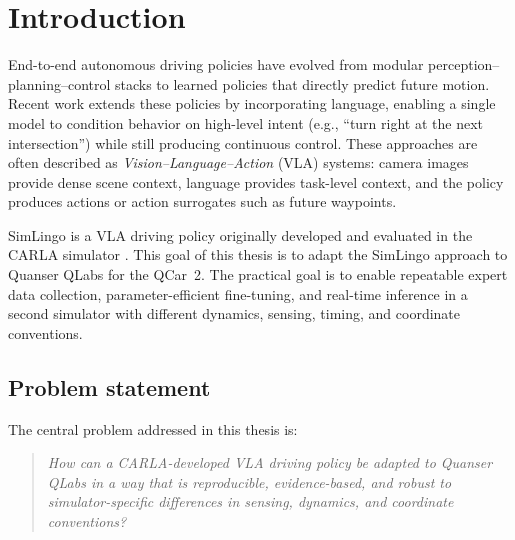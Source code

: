 \chapter{Introduction}
\label{ch:introduction}

End-to-end autonomous driving policies have evolved from modular perception--planning--control stacks to learned policies \citep{pomerleau1988alvinn,bojarski2016end} that directly predict future motion. Recent work extends these policies by incorporating language, enabling a single model to condition behavior on high-level intent (e.g., ``turn right at the next intersection'') while still producing continuous control. These approaches are often described as \emph{Vision--Language--Action} (VLA) systems: camera images provide dense scene context, language provides task-level context, and the policy produces actions or action surrogates such as future waypoints.

SimLingo is a VLA driving policy originally developed and evaluated in the CARLA simulator \citep{simlingo2023,dosovitskiy2017carla}. This goal of this thesis is to adapt the SimLingo approach to Quanser QLabs for the QCar~2. The practical goal is to enable repeatable expert data collection, parameter-efficient fine-tuning, and real-time inference in a second simulator with different dynamics, sensing, timing, and coordinate conventions.

\section{Problem statement}
\label{sec:problem-statement}
The central problem addressed in this thesis is:
\begin{quote}
\emph{How can a CARLA-developed VLA driving policy be adapted to Quanser QLabs in a way that is reproducible, evidence-based, and robust to simulator-specific differences in sensing, dynamics, and coordinate conventions?}
\end{quote}


